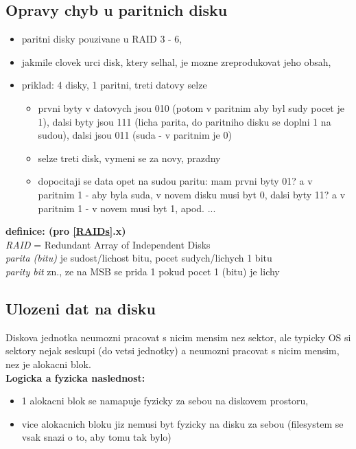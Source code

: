 \documentclass[a4paper, 11pt]{article}
\begin{document}
\subsection{Opravy chyb u paritnich disku}
\begin{itemize}
    \item paritni disky pouzivane u RAID 3 - 6,
    \item jakmile clovek urci disk, ktery selhal, je mozne zreprodukovat jeho obsah,
    \item priklad: 4 disky, 1 paritni, treti datovy selze
    \begin{itemize}
        \item prvni byty v datovych jsou 010 (potom v paritnim aby byl sudy pocet je 1), dalsi byty jsou 111 (licha parita, do paritniho disku se doplni 1 na sudou), dalsi jsou 011 (suda - v paritnim je 0)
        \item selze treti disk, vymeni se za novy, prazdny
        \item dopocitaji se data opet na sudou paritu: mam prvni byty 01? a v paritnim 1 - aby byla suda, v novem disku musi byt 0, dalsi byty 11? a v paritnim 1 - v novem musi byt 1, apod. ... \\
    \end{itemize}
\end{itemize}

\noindent\textbf{definice: (pro \ref{RAIDs}.x)} \\[0.5em]
\textit{RAID} = Redundant Array of Independent Disks \\[0.2em]
\textit{parita (bitu)} je sudost/lichost bitu, pocet sudych/lichych 1 bitu \\[0.2em]
\textit{parity bit} zn., ze na MSB se prida 1 pokud pocet 1 (bitu) je lichy \\

\subsection{Ulozeni dat na disku}
Diskova jednotka neumozni pracovat s nicim mensim nez sektor, ale typicky OS si sektory nejak seskupi (do vetsi jednotky) a neumozni pracovat s nicim mensim, nez je alokacni blok. \\

\noindent\textbf{Logicka a fyzicka naslednost:}
\begin{itemize}
    \item 1 alokacni blok se namapuje fyzicky za sebou na diskovem prostoru,
    \item vice alokacnich bloku jiz nemusi byt fyzicky na disku za sebou (filesystem se vsak snazi o to, aby tomu tak bylo) \\
\end{itemize}
\end{document}
